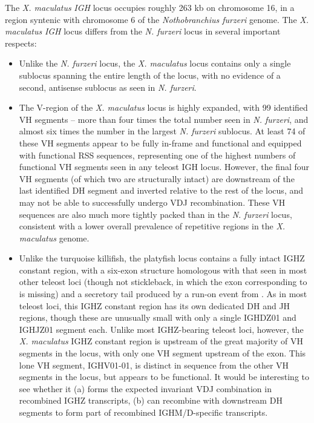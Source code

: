 	The \textit{X. maculatus} \textit{IGH} locus occupies roughly 263 kb on chromosome 16, in a region syntenic with chromosome 6 of the \textit{Nothobranchius furzeri} genome. %
	The \textit{X. maculatus} \textit{IGH} locus differs from the \textit{N. furzeri} locus in several important respects: %
	\begin{itemize}
	\item Unlike the \textit{N. furzeri} locus, the \textit{X. maculatus} locus contains only a single sublocus spanning the entire length of the locus, with no evidence of a second, antisense sublocus as seen in \textit{N. furzeri}.
	\item The V-region of the \textit{X. maculatus} locus is highly expanded, with 99 identified VH segments -- more than four times the total number seen in \textit{N. furzeri}, and almost six times the number in the largest \textit{N. furzeri} sublocus. At least 74 of these VH segments appear to be fully in-frame and functional and equipped with functional RSS sequences, representing one of the highest numbers of functional VH segments seen in any teleost IGH locus. However, the final four VH segments (of which two are structurally intact) are downstream of the last identified DH segment and inverted relative to the rest of the locus, and may not be able to successfully undergo VDJ recombination. These VH sequences are also much more tightly packed than in the \textit{N. furzeri} locus, consistent with a lower overall prevalence of repetitive regions in the \textit{X. maculatus} genome. %
	\item Unlike the turquoise killifish, the platyfish locus contains a fully intact IGHZ constant region, with a six-exon structure homologous with that seen in most other teleost loci (though not stickleback, in which the exon corresponding to  is missing) and a secretory tail produced by a run-on event from . As in most teleost loci, this IGHZ constant region has its own dedicated DH and JH regions, though these are unusually small with only a single IGHDZ01 and IGHJZ01 segment each. %
	Unlike most IGHZ-bearing teleost loci, however, the \textit{X. maculatus} IGHZ constant region is upstream of the great majority of VH segments in the locus, with only one VH segment upstream of the  exon. This lone VH segment, IGHV01-01, is distinct in sequence from the other VH segments in the locus, but appears to be functional. It would be interesting to see whether it (a) forms the expected invariant VDJ combination in recombined IGHZ transcripts, (b) can recombine with downstream DH segments to form part of recombined IGHM/D-specific transcripts. %

\end{itemize}
